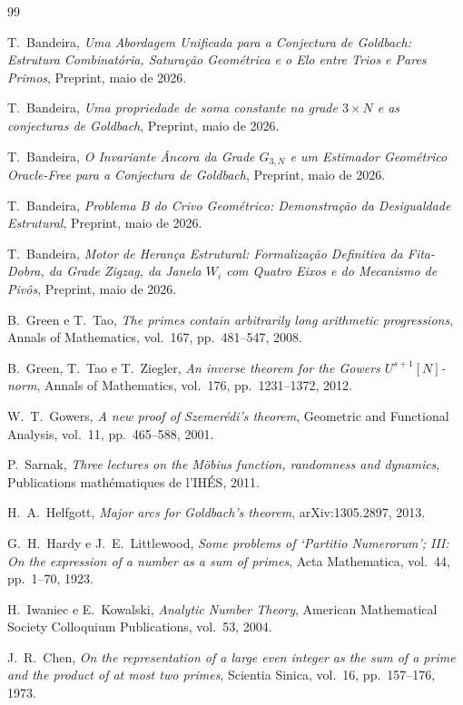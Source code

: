 \documentclass[12pt,a4paper]{article}
\theoremstyle{definition}
\begin{document}
	\begin{thebibliography}{99}
		
		T.~Bandeira,
		\textit{Uma Abordagem Unificada para a Conjectura de Goldbach:
			Estrutura Combinatória, Saturação Geométrica e o Elo entre
			Trios e Pares Primos},
		Preprint, maio de 2026.
		
		T.~Bandeira,
		\textit{Uma propriedade de soma constante na grade $3 \times N$
			e as conjecturas de Goldbach},
		Preprint, maio de 2026.
		
		T.~Bandeira,
		\textit{O Invariante Âncora da Grade $G_{3,N}$ e um Estimador
			Geométrico Oracle-Free para a Conjectura de Goldbach},
		Preprint, maio de 2026.
		
		T.~Bandeira,
		\textit{Problema B do Crivo Geométrico: Demonstração da
			Desigualdade Estrutural},
		Preprint, maio de 2026.
		
		T.~Bandeira,
		\textit{Motor de Herança Estrutural: Formalização Definitiva
			da Fita-Dobra, da Grade Zigzag, da Janela $W_i$ com Quatro
			Eixos e do Mecanismo de Pivôs},
		Preprint, maio de 2026.
		
		B.~Green e T.~Tao,
		\textit{The primes contain arbitrarily long arithmetic
			progressions},
		Annals of Mathematics, vol.~167, pp.~481--547, 2008.
		
		B.~Green, T.~Tao e T.~Ziegler,
		\textit{An inverse theorem for the Gowers $U^{s+1}[N]$-norm},
		Annals of Mathematics, vol.~176, pp.~1231--1372, 2012.
		
		W.~T.~Gowers,
		\textit{A new proof of Szemerédi's theorem},
		Geometric and Functional Analysis, vol.~11, pp.~465--588, 2001.
		
		P.~Sarnak,
		\textit{Three lectures on the Möbius function, randomness and
			dynamics},
		Publications mathématiques de l'IHÉS, 2011.
		
		H.~A.~Helfgott,
		\textit{Major arcs for Goldbach's theorem},
		arXiv:1305.2897, 2013.
		
		G.~H.~Hardy e J.~E.~Littlewood,
		\textit{Some problems of `Partitio Numerorum'; III: On the
			expression of a number as a sum of primes},
		Acta Mathematica, vol.~44, pp.~1--70, 1923.
		
		H.~Iwaniec e E.~Kowalski,
		\textit{Analytic Number Theory},
		American Mathematical Society Colloquium Publications,
		vol.~53, 2004.
		
		J.~R.~Chen,
		\textit{On the representation of a large even integer as the
			sum of a prime and the product of at most two primes},
		Scientia Sinica, vol.~16, pp.~157--176, 1973.
		
	\end{thebibliography}
	
\end{document}
